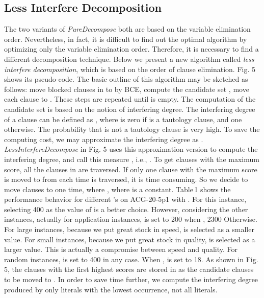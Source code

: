 \documentclass{llncs}
\begin{document}
\subsection{Less Interfere Decomposition}

The two variants of \emph{PureDecompose} both are based on the
variable elimination order. Nevertheless, in fact, it is difficult
to find out the optimal algorithm by optimizing only the variable
elimination order. Therefore, it is necessary to find a different
decomposition technique. Below we present a new algorithm called
\emph{less interfere decomposition}, which is based on the order of
clause elimination. Fig. 5 shows its pseudo-code. The basic outline
of this algorithm may be sketched as follows: move blocked clauses
in  to  by BCE, compute the candidate set , move each
clause  to . These steps are repeated until 
is empty. The computation of the candidate set  is based on the
notion of interfering degree. The interfering degree of a clause 
can be defined as , where  is zero
if  is a tautology clause, and one otherwise. The probability
that  is not a tautology clause is very high. To
save the computing cost, we may approximate the interfering degree
as . \emph{LessInterfereDecompose} in Fig. 5 uses this
approximation version to compute the interfering degree, and call
this measure , i.e., . To get clauses with the
maximum score, all the clauses in  are traversed. If only one
clause with the maximum score is moved to  from  each time 
is traversed, it is time consuming. So we decide to move  clauses
to  one time, where , where  is a
constant. Table\,1 shows the performance behavior for different
's on ACG-20-5p1 with . For this instance,
selecting 400 as the value of  is a better choice. However,
considering the other instances, actually for application instances,
 is set to 200 when , 2300 Otherwise.
For large instances, because we put great stock in speed, 
is selected as a smaller value. For small instances, because we put
great stock in quality,  is selected as a larger value. This
is actually a compromise between speed and quality. For random
instances,  is set to 400 in any case. When
,  is set to 18. As shown in Fig. 5,
the clauses with the first  highest scores are stored in  as
the candidate clauses to be moved to . In order to save time
further, we compute the interfering degree produced by only literals
with the lowest occurrence, not all literals.
\end{document}
